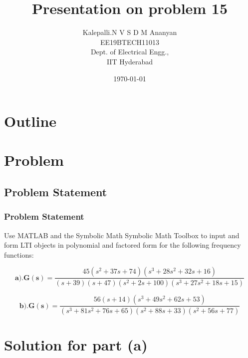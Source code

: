 \documentclass{beamer}
\title{Presentation on problem 15}
\author{Kalepalli.N V S D M Ananyan\\EE19BTECH11013\\ Dept. of Electrical Engg.,\\IIT Hyderabad }
\date{\today}
\theoremstyle{remark}
\let\vec\mathbf
\begin{document}
\begin{frame}
\titlepage
\end{frame}









\section*{Outline}
\begin{frame}
\tableofcontents
\end{frame}










\section{Problem}
\subsection{Problem Statement}
\begin{frame}
\frametitle{Problem Statement}

 Use MATLAB and the Symbolic Math Symbolic Math Toolbox to input and form LTI objects in polynomial and factored form for the following frequency functions:

\begin{equation}
\vec{a)}. \vec{G(s)} = \frac{45(s^2+37s+74)(s^3+28s^2+32s+16)}{(s+39)(s+47)(s^2+2s+100)(s^3+27s^2+18s+15)}
\end{equation}

\begin{equation}
\vec{b)}. \vec{G(s)} = \frac{56(s+14)(s^3+49s^2+62s+53)}{(s^3+81s^2+76s+65)(s^2+88s+33)(s^2+56s+77)}
\end{equation}

\end{frame}












\section{Solution for part (a)}
\end{document}
